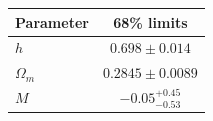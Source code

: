 \begin{tabular} { l  c}

 Parameter &  68\% limits\\
\hline
{\boldmath$h              $} & $0.698\pm 0.014            $\\

{\boldmath$Ω_m            $} & $0.2845\pm 0.0089          $\\

{\boldmath$M              $} & $-0.05^{+0.45}_{-0.53}     $\\
\hline
\end{tabular}